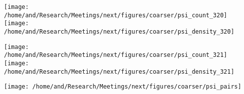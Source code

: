 \documentclass{article}
\begin{document}
\centering
\texttt{[image: /home/and/Research/Meetings/next/figures/coarser/psi\_count\_320]}
\texttt{[image: /home/and/Research/Meetings/next/figures/coarser/psi\_density\_320]}

\texttt{[image: /home/and/Research/Meetings/next/figures/coarser/psi\_count\_321]}
\texttt{[image: /home/and/Research/Meetings/next/figures/coarser/psi\_density\_321]}

\texttt{[image: /home/and/Research/Meetings/next/figures/coarser/psi\_pairs]}
\end{document}
